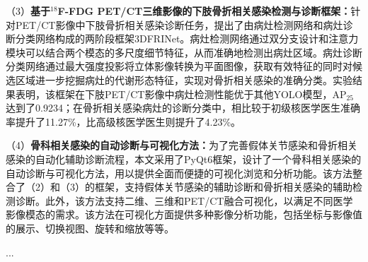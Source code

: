 \begin{cabstract}
    （3）\textbf{基于\(^{18}\)F-FDG PET/CT三维影像的下肢骨折相关感染检测与诊断框架：}针对PET/CT影像中下肢骨折相关感染诊断任务，提出了由病灶检测网络和病灶诊断分类网络构成的两阶段框架3DFRINet。病灶检测网络通过双分支设计和注意力模块可以结合两个模态的多尺度细节特征，从而准确地检测出病灶区域。病灶诊断分类网络通过最大强度投影将立体影像转换为平面图像，获取有效特征的同时对候选区域进一步挖掘病灶的代谢形态特征，实现对骨折相关感染的准确分类。实验结果表明，该框架在下肢PET/CT影像中病灶检测性能优于其他YOLO模型，AP\(_{25}\)达到了0.9234；在骨折相关感染病灶的诊断分类中，相比较于初级核医学医生准确率提升了11.27\%，比高级核医学医生则提升了4.23\%。

    （4）\textbf{骨科相关感染的自动诊断与可视化方法：}为了完善假体关节感染和骨折相关感染的自动化辅助诊断流程，本文采用了PyQt6框架，设计了一个骨科相关感染的自动诊断与可视化方法，用以提供全面而便捷的可视化浏览和分析功能。该方法整合了（2）和（3）的框架，支持假体关节感染的辅助诊断和骨折相关感染的辅助检测诊断。此外，该方法支持二维、三维和PET/CT融合可视化，以满足不同医学影像模态的需求。该方法在可视化方面提供多种影像分析功能，包括坐标与影像值的展示、切换视图、旋转和缩放等等。

\end{cabstract}


\begin{eabstract}
    ...
\end{eabstract}

